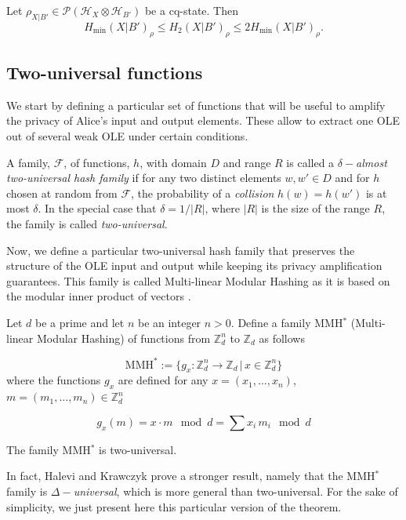\begin{lemma}
Let $\rho_{X|B'}\in\mathcal{P}(\mathcal{H}_X \otimes \mathcal{H}_{B'})$ be a cq-state. Then
$$H_{\min}(X|B')_{\rho} \leq H_2(X|B')_{\rho} \leq 2 H_{\min}(X|B')_{\rho}.$$
\end{lemma}



\subsection{Two-universal functions}

We start by defining a particular set of functions that will be useful to amplify the privacy of Alice's input and output elements. These allow to extract one OLE out of several weak OLE under certain conditions.


\begin{definition}
A family, $\mathcal{F}$, of functions, $h$, with domain $D$ and range $R$ is called a \textit{$\delta-$almost two-universal hash family} if for any two distinct elements $w,w'\in D$ and for $h$ chosen at random from $\mathcal{F}$, the probability of a \textit{collision} $h(w)=h(w')$ is at most $\delta$. In the special case that $\delta=1/|R|$, where $|R|$ is the size of the range $R$, the family is called \textit{two-universal}. 
\end{definition}

Now, we define a particular two-universal hash family that preserves the structure of the OLE input and output while keeping its privacy amplification guarantees. This family is called Multi-linear Modular Hashing as it is based on the modular inner product of vectors \cite{HK97}.
\begin{definition}
Let $d$ be a prime and let $n$ be an integer $n>0$. Define a family MMH$^*$ (Multi-linear Modular Hashing) of functions from $\mathbb{Z}_d^n$ to $\mathbb{Z}_d$ as follows

$$\text{MMH}^*:= \{ g_x : \mathbb{Z}_d^n\rightarrow \mathbb{Z}_d \, | \, x\in \mathbb{Z}_d^n \}$$
where the functions $g_x$ are defined for any $x = (x_1,\ldots,x_n)$, $m = (m_1,\ldots, m_n) \in \mathbb{Z}_d^n$

$$g_x(m) = x\cdot m \mod d = \sum x_i\, m_i \mod d$$
\label{def:MMH}
\end{definition}



\begin{theorem}
The family MMH$^*$ is two-universal.
\end{theorem}
In fact, Halevi and Krawczyk \cite{HK97} prove a stronger result, namely that the MMH$^*$ family is \textit{$\Delta-$universal}, which is more general than two-universal. For the sake of simplicity, we just present here this particular version of the theorem.

